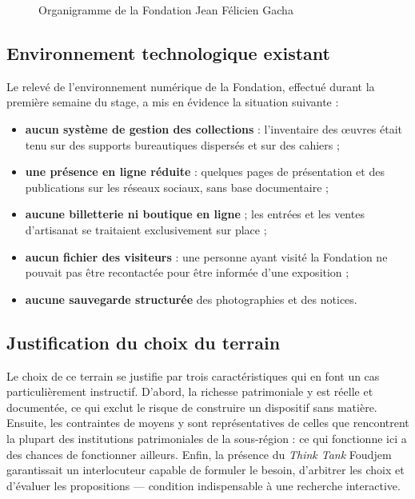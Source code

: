 \begin{figure}[htbp]
\centering
{}
\caption{Organigramme de la Fondation Jean Félicien Gacha}
\label{fig:organigramme}
\end{figure}

\subsection{Environnement technologique existant}

Le relevé de l'environnement numérique de la Fondation, effectué durant la
première semaine du stage, a mis en évidence la situation suivante :

\begin{itemize}
  \item \textbf{aucun système de gestion des collections} : l'inventaire des
        œuvres était tenu sur des supports bureautiques dispersés et sur des
        cahiers ;
  \item \textbf{une présence en ligne réduite} : quelques pages de présentation
        et des publications sur les réseaux sociaux, sans base documentaire ;
  \item \textbf{aucune billetterie ni boutique en ligne} ; les entrées et les
        ventes d'artisanat se traitaient exclusivement sur place ;
  \item \textbf{aucun fichier des visiteurs} : une personne ayant visité la
        Fondation ne pouvait pas être recontactée pour être informée d'une
        exposition ;
  \item \textbf{aucune sauvegarde structurée} des photographies et des notices.
\end{itemize}

\subsection{Justification du choix du terrain}

Le choix de ce terrain se justifie par trois caractéristiques qui en font un cas
particulièrement instructif. D'abord, la richesse patrimoniale y est réelle et
documentée, ce qui exclut le risque de construire un dispositif sans matière.
Ensuite, les contraintes de moyens y sont représentatives de celles que
rencontrent la plupart des institutions patrimoniales de la sous-région : ce qui
fonctionne ici a des chances de fonctionner ailleurs. Enfin, la présence du
\emph{Think Tank} Foudjem garantissait un interlocuteur capable de formuler le
besoin, d'arbitrer les choix et d'évaluer les propositions — condition
indispensable à une recherche interactive.

